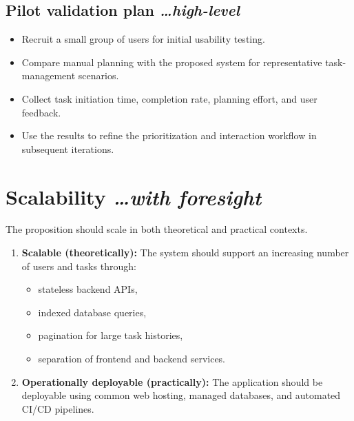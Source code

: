 \documentclass[11pt,a4paper]{article}
\newcommand{\BvrHint}[1]{%
  {\normalfont\normalsize\itshape\hfill #1}}
\begin{document}
\subsection{Pilot validation plan %
\BvrHint{\ldots high-level}}

\begin{itemize}[leftmargin=0.7cm]
    \item Recruit a small group of users for initial usability testing.
    
    \item Compare manual planning with the proposed system for representative
    task-management scenarios.
    
    \item Collect task initiation time, completion rate, planning effort,
    and user feedback.
    
    \item Use the results to refine the prioritization and interaction
    workflow in subsequent iterations.
\end{itemize}

\section{Scalability %
\BvrHint{\ldots with foresight}}

The proposition should scale in both theoretical and practical contexts.

\begin{enumerate}[leftmargin=0.7cm]
    \item \textbf{Scalable (theoretically):} The system should support an
    increasing number of users and tasks through:
    
    \begin{itemize}[leftmargin=0.7cm]
        \item stateless backend APIs,
        \item indexed database queries,
        \item pagination for large task histories,
        \item separation of frontend and backend services.
    \end{itemize}
    
    \item \textbf{Operationally deployable (practically):} The application
    should be deployable using common web hosting, managed databases, and
    automated CI/CD pipelines.
\end{enumerate}
\end{document}
